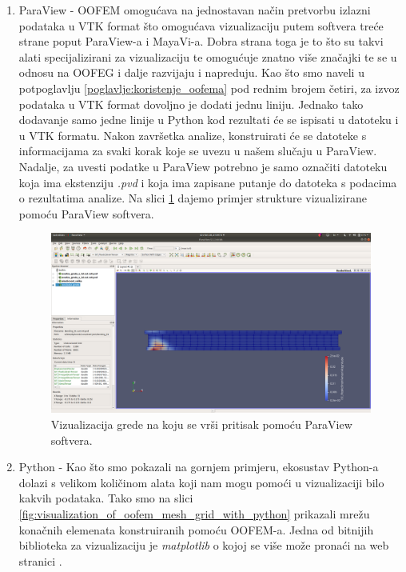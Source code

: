 \documentclass[a4paper,twoside,12pt]{memoir} %
\begin{document}
\begin{enumerate}
    \item ParaView - OOFEM omogućava na jednostavan način pretvorbu izlazni podataka u VTK format što omogućava vizualizaciju putem softvera treće strane poput ParaView-a i MayaVi-a. Dobra strana toga je to što su takvi alati specijalizirani za vizualizaciju te omogućuje znatno više značajki te se u odnosu na OOFEG i dalje razvijaju i napreduju. Kao što smo naveli u potpoglavlju \ref{poglavlje:koristenje_oofema} pod rednim brojem četiri, za izvoz podataka u VTK format dovoljno je dodati jednu liniju. Jednako tako dodavanje samo jedne linije u Python kod rezultati će se ispisati u datoteku i u VTK formatu. Nakon završetka analize, konstruirati će se datoteke s informacijama za svaki korak koje se uvezu u našem slučaju u ParaView. Nadalje, za uvesti podatke u ParaView potrebno je samo označiti datoteku koja ima ekstenziju \textit{.pvd} i koja ima zapisane putanje do datoteka s podacima o rezultatima analize. Na slici \ref{fig:paraview_example} dajemo primjer strukture vizualizirane pomoću ParaView softvera.
        \begin{figure}[h!t]
        \begin{center}
        \includegraphics[scale=0.2]{pictures/chapter_oofem/paraview_beam_bending_full.png}
        \caption{Vizualizacija grede na koju se vrši pritisak pomoću ParaView softvera.}
        \label{fig:paraview_example}
        \end{center}
        \end{figure}
    \item Python - Kao što smo pokazali na gornjem primjeru, ekosustav Python-a dolazi s velikom količinom alata koji nam mogu pomoći u vizualizaciji bilo kakvih podataka. Tako smo na slici \ref{fig:visualization_of_oofem_mesh_grid_with_python} prikazali mrežu konačnih elemenata konstruiranih pomoću OOFEM-a. Jedna od bitnijih biblioteka za vizualizaciju je \textit{matplotlib} o kojoj se više može pronaći na web stranici \cite{matplotlib_web}.
\end{enumerate}
\end{document}
